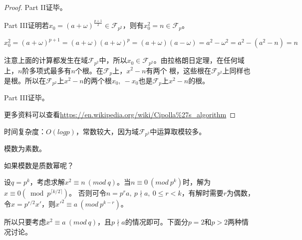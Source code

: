 \begin{proof}
Part II证毕。

\vbox{}

{\heiti Part III\quad 证明若$x_{0}=(a+\omega)^{\frac{p+1}{2}} \in \mathcal{F}_{p^{2}}$，则有$x_{0}^{2}=n \in \mathcal{F}_{p}$。}

$$
x_{0}^{2}=(a+\omega)^{p+1}=(a+\omega)(a+\omega)^{p}=(a+\omega)(a-\omega)=a^{2}-\omega^{2}=a^{2}-\left(a^{2}-n\right)=n
$$

注意上面的计算都发生在域$\mathcal{F}_{p^{2}}$中，所以$x_0\in \mathcal{F}_{p^{2}}$。由拉格朗日定理，在任何域上，$n$阶多项式最多有$n$个根。在$\mathcal{F}_{p}$上，$x^2-n$有两个
根，这些根在$\mathcal{F}_{p^{2}}$上同样也是根。所以在$\mathcal{F}_{p^{2}}$上$x^2-n$的两个根$x_0,\ -x_0$也是$\mathcal{F}_{p}$上$x^2-n$的根。

Part III证毕。

更多资料可以查看\href{https://en.wikipedia.org/wiki/Cipolla\%27s_algorithm}{https://en.wikipedia.org/wiki/Cipolla\%27s\_algorithm}
\end{proof}

\vbox{}

{\heiti 时间复杂度：$O(logp)$，常数较大，因为域$\mathcal{F}_{p^{2}}$中运算取模较多。}

模数为素数。


\vbox{}

{\heiti 如果模数是质数幂呢？}

设$q=p^k$，考虑求解$x^2\equiv n\ (mod\ q)$。当$n\equiv 0\ (mod\ p^k)$时，解为$x \equiv 0\left(\bmod p^{\lceil k / 2\rceil}\right)$。
否则可令$n=p^{r} a,\ p \nmid a,\ 0 \leqslant r<k$，有解时需要$r$为偶数，令$x=p^{r/2}x'$，则$x'^2\equiv a\ (mod\ p^{k-r})$。

所以只要考虑$x^2\equiv a\ (mod\ q)$，且$p\nmid a$的情况即可。下面分$p=2$和$p>2$两种情况讨论。

